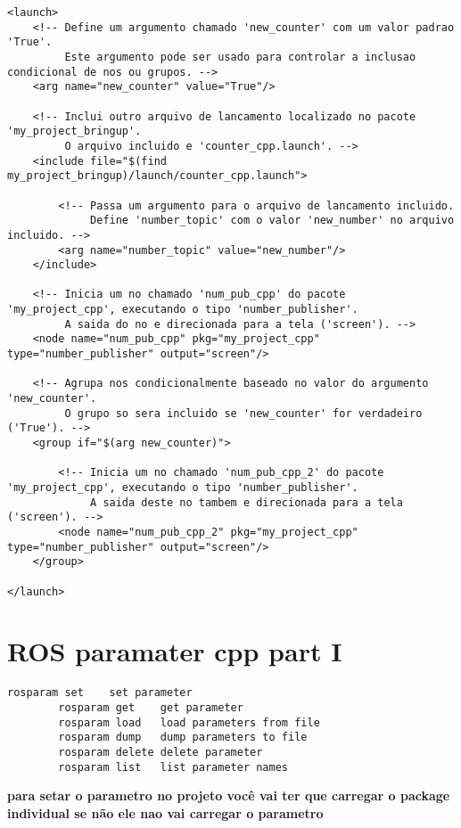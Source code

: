 \documentclass[letterpaper]{article}
\begin{document}
\begin{lstlisting}[style=xmlStyle, title=my\_project\_cpp.launch] 
<launch>
    <!-- Define um argumento chamado 'new_counter' com um valor padrao 'True'.
         Este argumento pode ser usado para controlar a inclusao condicional de nos ou grupos. -->
    <arg name="new_counter" value="True"/>
    
    <!-- Inclui outro arquivo de lancamento localizado no pacote 'my_project_bringup'.
         O arquivo incluido e 'counter_cpp.launch'. -->
    <include file="$(find my_project_bringup)/launch/counter_cpp.launch">
        
        <!-- Passa um argumento para o arquivo de lancamento incluido.
             Define 'number_topic' com o valor 'new_number' no arquivo incluido. -->
        <arg name="number_topic" value="new_number"/>
    </include>
    
    <!-- Inicia um no chamado 'num_pub_cpp' do pacote 'my_project_cpp', executando o tipo 'number_publisher'.
         A saida do no e direcionada para a tela ('screen'). -->
    <node name="num_pub_cpp" pkg="my_project_cpp" type="number_publisher" output="screen"/>
    
    <!-- Agrupa nos condicionalmente baseado no valor do argumento 'new_counter'.
         O grupo so sera incluido se 'new_counter' for verdadeiro ('True'). -->
    <group if="$(arg new_counter)">
        
        <!-- Inicia um no chamado 'num_pub_cpp_2' do pacote 'my_project_cpp', executando o tipo 'number_publisher'.
             A saida deste no tambem e direcionada para a tela ('screen'). -->
        <node name="num_pub_cpp_2" pkg="my_project_cpp" type="number_publisher" output="screen"/>
    </group>
    
</launch>

\end{lstlisting}
\section{ROS paramater cpp part I}
\begin{lstlisting}[style=cpptyle, title=terminal ROS] 
        rosparam set    set parameter
        rosparam get    get parameter
        rosparam load   load parameters from file
        rosparam dump   dump parameters to file
        rosparam delete delete parameter
        rosparam list   list parameter names
\end{lstlisting}

\textbf{para setar o parametro no projeto você vai ter que carregar o package individual se não ele nao vai carregar o parametro}
\end{document}
